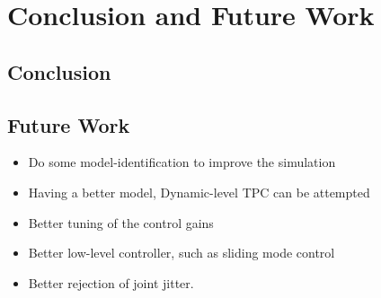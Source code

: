 \chapter{Conclusion and Future Work}
\label{ch:conclusion}

\section{Conclusion}

\section{Future Work}
\label{sec:conclusion:future_work}

\begin{itemize}
    \item Do some model-identification to improve the simulation
    \item Having a better model, Dynamic-level TPC can be attempted
    \item Better tuning of the control gains
    \item Better low-level controller, such as sliding mode control
    \item Better rejection of joint jitter.
\end{itemize}
